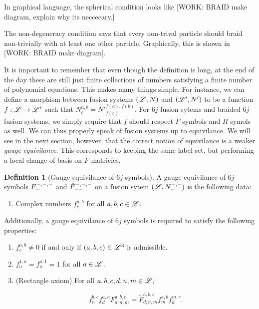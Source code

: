 \documentclass{article}
\theoremstyle{definition}
\newtheorem*{definition}{Definition}
\numberwithin{figure}{section}
\begin{document}
\begin{enumerate}[\thesection .1.]
In graphical language, the spherical condition looks like [WORK: BRAID make diagram, explain why its neccecary.]

The non-degeneracy condition says that every non-trival particle should braid non-trivially with at least one other particle. Graphically, this is shown in [WORK: BRAID make diagram].

It is important to remember that even though the definition is long, at the end of the day these are still just finite collections of numbers satisfying a finite number of polynomial equations. This makes many things simple. For instance, we can define a morphism between fusion systems $(\mathscr{L},N)$ and $(\mathscr{L}',N')$ to be a function $f:\mathscr{L}\to \mathscr{L}'$ such that $N^{a,b}_{c}=N'^{f(a),f(b)}_{f(c)}$. For $6j$ fusion sytems and braided $6j$ fusion systems, we simply require that $f$ should respect $F$ symbols and $R$ symols as well. We can thus properly speak of fusion systems up to equivilance. We will see in the next section, however, that the correct notion of equivilance is a weaker \textit{gauge equivilance}. This corresponds to keeping the same label set, but performing a local change of basis on $F$ matricies.

\begin{definition}[Gauge equivilance of $6j$ symbols] A gauge equivilance of $6j$ symbols $F^{\--,\--,\--}_{\--}$ and $\tilde{F}^{\--,\--,\--}_{--}$ on a fusion sytem $(\mathscr{L},N^{\--,\--}_{\--})$ is the following data:

\begin{enumerate}
\item Complex numbers $f^{a,b}_{c}$ for all $a,b,c\in \mathscr{L}$.
\end{enumerate}

Additionally, a gauge equivilance of $6j$ symbols is required to satisfy the following properties:

\begin{enumerate}
\item $f^{a,b}_{c}\neq 0$ if and only if $(a,b,c)\in \mathscr{L}^3$ is admissible.
\item $f^{1,a}_{a}=f^{a,1}_{a}=1$ for all $a\in \mathscr{L}$.
\item (Rectangle axiom) For all $a,b,c,d,n,m\in \mathscr{L}$,

$$f_n^{b,c}f^{a,n}_{d}F^{a,b,c}_{d;n,m}=\tilde{F}^{a,b,c}_{d;n,m}f^{a,b}_{m}f^{m,c}_{d}.$$
\end{enumerate}
\raggedleft\qedsymbol{}
\end{definition}


\end{enumerate}
\end{document}
